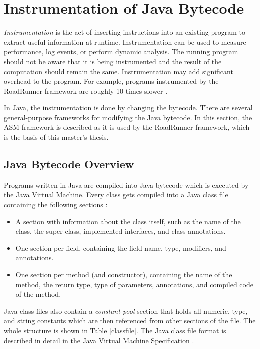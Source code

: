 \section{Instrumentation of Java Bytecode}

\emph{Instrumentation} is the act of inserting instructions into an existing
program to extract useful information at runtime. Instrumentation can be used to
measure performance, log events, or perform dynamic analysis. The running
program should not be aware that it is being instrumented and the result of the
computation should remain the same. Instrumentation may add significant overhead
to the program. For example, programs instrumented by the RoadRunner framework
are roughly 10 times slower \cite{RoadRunner}.

In Java, the instrumentation is done by changing the bytecode. There are several
general-purpose frameworks for modifying the Java bytecode. In this section, the
ASM framework is described as it is used by the RoadRunner framework, which is
the basis of this master's thesis.

\subsection{Java Bytecode Overview}

Programs written in Java are compiled into Java bytecode which is executed by
the Java Virtual Machine. Every class gets compiled into a Java class file
containing the following sections \cite{asmguide}:
\begin{itemize}
    \item A section with information about the class itself, such as the name of
    the class, the super class, implemented interfaces, and class annotations.
    \item One section per field, containing the field name, type, modifiers, and
    annotations.
    \item One section per method (and constructor), containing the name of the
    method, the return type, type of parameters, annotations, and compiled code
    of the method.
\end{itemize}

Java class files also contain a \emph{constant pool} section that holds all
numeric, type, and string constants which are then referenced from other
sections of the file. The whole structure is shown in Table \ref{classfile}.
The Java class file format is described in detail in the Java Virtual Machine
Specification \cite{jvmspec}.

